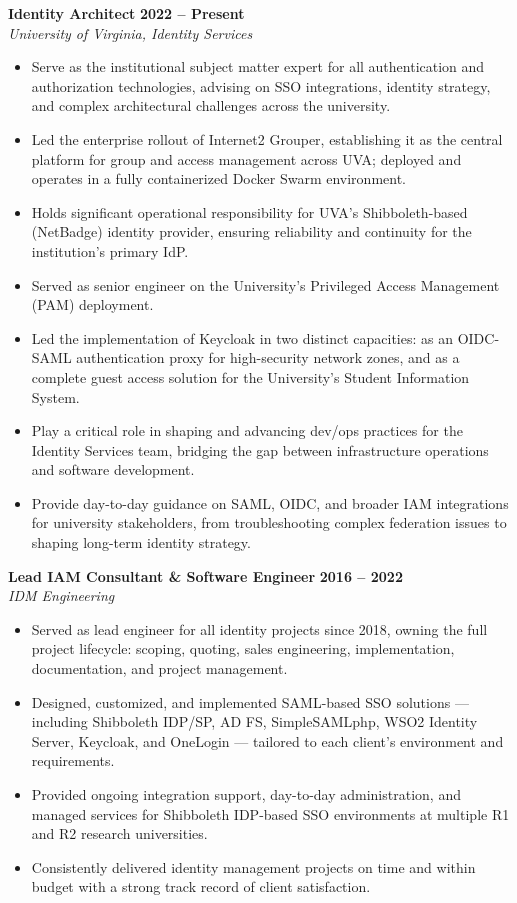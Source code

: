 \documentclass[12pt, letterpaper]{article}
\begin{document}
\textbf{Identity Architect} \hfill \textbf{2022 -- Present} \\
\textit{University of Virginia, Identity Services}
\begin{itemize}
  \item Serve as the institutional subject matter expert for all authentication and authorization technologies, advising on SSO integrations, identity strategy, and complex architectural challenges across the university.
  \item Led the enterprise rollout of Internet2 Grouper, establishing it as the central platform for group and access management across UVA; deployed and operates in a fully containerized Docker Swarm environment.
  \item Holds significant operational responsibility for UVA's Shibboleth-based (NetBadge) identity provider, ensuring reliability and continuity for the institution's primary IdP.
  \item Served as senior engineer on the University's Privileged Access Management (PAM) deployment.
  \item Led the implementation of Keycloak in two distinct capacities: as an OIDC-SAML authentication proxy for high-security network zones, and as a complete guest access solution for the University's Student Information System.
  \item Play a critical role in shaping and advancing dev/ops practices for the Identity Services team, bridging the gap between infrastructure operations and software development.
  \item Provide day-to-day guidance on SAML, OIDC, and broader IAM integrations for university stakeholders, from troubleshooting complex federation issues to shaping long-term identity strategy.
\end{itemize}

\vspace{2pt}

\textbf{Lead IAM Consultant \& Software Engineer} \hfill \textbf{2016 -- 2022} \\
\textit{IDM Engineering}
\begin{itemize}
  \item Served as lead engineer for all identity projects since 2018, owning the full project lifecycle: scoping, quoting, sales engineering, implementation, documentation, and project management.
  \item Designed, customized, and implemented SAML-based SSO solutions --- including Shibboleth IDP/SP, AD FS, SimpleSAMLphp, WSO2 Identity Server, Keycloak, and OneLogin --- tailored to each client's environment and requirements.
  \item Provided ongoing integration support, day-to-day administration, and managed services for Shibboleth IDP-based SSO environments at multiple R1 and R2 research universities.
  \item Consistently delivered identity management projects on time and within budget with a strong track record of client satisfaction.
\end{itemize}
\end{document}
